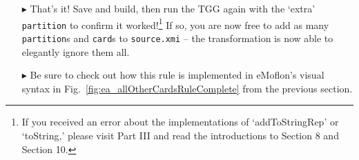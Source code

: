 \begin{itemize}
\item[$\blacktriangleright$] That's it! Save and build, then run the TGG again with the `extra' \texttt{partition} to confirm it worked!\footnote{If you
received an error about the implementations of `addToStringRep' or `toString,' please visit Part III and read the introductions to Section 8 and Section 10.}
If so, you are now free to add as many \texttt{partition}s and \texttt{card}s to \texttt{source.xmi} -- the transformation is now able to elegantly ignore them all.

\vspace{0.5cm}

\item[$\blacktriangleright$] Be sure to check out how this rule is implemented in eMoflon's visual syntax in Fig.~\ref{fig:ea_allOtherCardsRuleComplete} from
the previous section.

\end{itemize}
